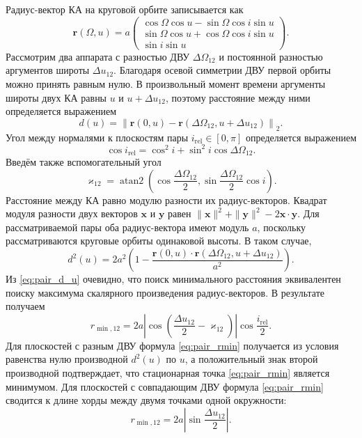 Радиус-вектор КА на круговой орбите записывается как
\begin{equation}
\mathbf r(\Omega,u)=a
\begin{pmatrix}
\cos\Omega\cos u-\sin\Omega\cos i\sin u \\
\sin\Omega\cos u+\cos\Omega\cos i\sin u \\
\sin i\sin u
\end{pmatrix}.
\end{equation}
Рассмотрим два аппарата с разностью ДВУ $\Delta\Omega_{12}$ и постоянной разностью аргументов широты $\Delta u_{12}$. Благодаря осевой симметрии ДВУ первой орбиты можно принять равным нулю. В произвольный момент времени аргументы широты двух КА равны $u$ и
$u+\Delta u_{12}$, поэтому расстояние между ними определяется выражением
\begin{equation}
    d(u)=\left\|\mathbf r(0,u)-
    \mathbf r(\Delta\Omega_{12},u+\Delta u_{12})\right\|_2.
\end{equation}
Угол между нормалями к плоскостям пары
$i_{\mathrm{rel}}\in[0,\pi]$ определяется выражением
\begin{equation}
    \cos i_{\mathrm{rel}}=
    \cos^2 i+\sin^2 i\cos\Delta\Omega_{12}.
\end{equation}
Введём также вспомогательный угол
\begin{equation}
    \varkappa_{12}=\operatorname{atan2}\left(
    \cos\frac{\Delta\Omega_{12}}{2},
    \sin\frac{\Delta\Omega_{12}}{2}\cos i
    \right).
\end{equation}
Расстояние между КА равно модулю разности их радиус-векторов. Квадрат модуля разности двух векторов $\mathbf x$ и $\mathbf y$ равен $\|\mathbf x\|^2+\|\mathbf y\|^2-2\mathbf x\cdot\mathbf y$. Для рассматриваемой пары оба радиус-вектора имеют модуль $a$, поскольку рассматриваются круговые орбиты одинаковой высоты. В таком случае,
\begin{equation}
\label{eq:pair_d_u}
    d^2(u)=2a^2\left(1-
    \frac{\mathbf r(0,u)\cdot
    \mathbf r(\Delta\Omega_{12},u+\Delta u_{12})}{a^2}\right).
\end{equation}
Из \eqref{eq:pair_d_u} очевидно, что поиск минимального расстояния эквивалентен поиску максимума скалярного произведения радиус-векторов. В результате получаем
\begin{equation}
\label{eq:pair_rmin}
    r_{\min,12}=
    2a\left|\cos\left(\frac{\Delta u_{12}}{2}-\varkappa_{12}\right)\right|
    \cos\frac{i_{\mathrm{rel}}}{2}.
\end{equation}
Для плоскостей с разным ДВУ формула \eqref{eq:pair_rmin} получается из условия равенства нулю производной $d^2(u)$ по $u$, а положительный знак второй производной подтверждает, что стационарная точка \eqref{eq:pair_rmin} является минимумом. Для плоскостей с совпадающим ДВУ формула \eqref{eq:pair_rmin} сводится к длине хорды между двумя точками одной окружности:
\begin{equation}
    r_{\min,12}=2a
    \left|\sin\frac{\Delta u_{12}}{2}\right|.
\end{equation}

